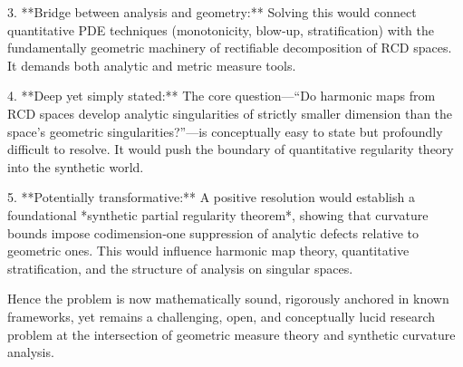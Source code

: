 3. **Bridge between analysis and geometry:**  
   Solving this would connect quantitative PDE techniques (monotonicity, blow‑up, stratification) with the fundamentally geometric machinery of rectifiable decomposition of \(\mathrm{RCD}\) spaces. It demands both analytic and metric measure tools.

4. **Deep yet simply stated:**  
   The core question—“Do harmonic maps from \(\mathrm{RCD}\) spaces develop analytic singularities of strictly smaller dimension than the space’s geometric singularities?”—is conceptually easy to state but profoundly difficult to resolve. It would push the boundary of quantitative regularity theory into the synthetic world.

5. **Potentially transformative:**  
   A positive resolution would establish a foundational *synthetic partial regularity theorem*, showing that curvature bounds impose codimension‑one suppression of analytic defects relative to geometric ones. This would influence harmonic map theory, quantitative stratification, and the structure of analysis on singular spaces.

Hence the problem is now mathematically sound, rigorously anchored in known frameworks, yet remains a challenging, open, and conceptually lucid research problem at the intersection of geometric measure theory and synthetic curvature analysis.